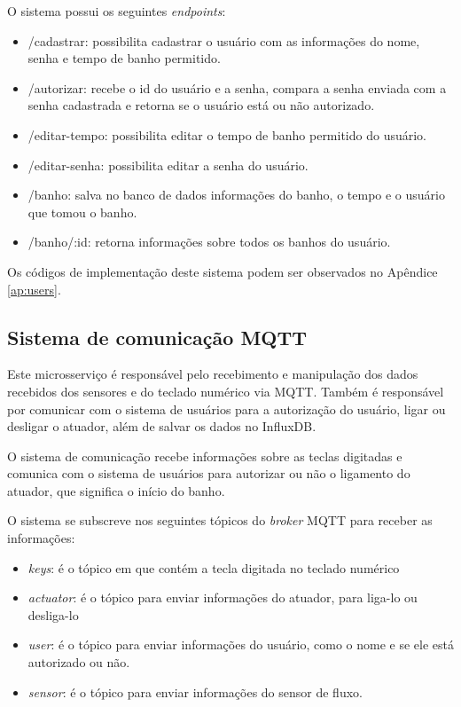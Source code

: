 O sistema possui os seguintes \textit{endpoints}:


\begin{itemize} \label{item:endpoints}
	\item /cadastrar: possibilita cadastrar o usuário com as informações do nome, senha e tempo de banho permitido.
	\item /autorizar: recebe o id do usuário e a senha, compara a senha enviada com a senha cadastrada e retorna se o usuário está ou não autorizado.
	\item /editar-tempo: possibilita editar o tempo de banho permitido do usuário.
	\item /editar-senha: possibilita editar a senha do usuário.
	\item /banho: salva no banco de dados informações do banho, o tempo e o usuário que tomou o banho.
	\item /banho/:id: retorna informações sobre todos os banhos do usuário.
\end{itemize}

Os códigos de implementação deste sistema podem ser observados no Apêndice \ref{ap:users}.

\subsection{Sistema de comunicação MQTT}

Este microsserviço é responsável pelo recebimento e manipulação dos dados recebidos dos sensores e do teclado numérico via MQTT. Também é responsável por comunicar com o sistema de usuários para a autorização do usuário, ligar ou desligar o atuador, além de salvar os dados no InfluxDB.

O sistema de comunicação recebe informações sobre as teclas digitadas e comunica com o sistema de usuários para autorizar ou não o ligamento do atuador, que significa o início do banho.

O sistema se subscreve nos seguintes tópicos do \textit{broker} MQTT para receber as informações:

\begin{itemize}
	\item \textit{keys}: é o tópico em que contém a tecla digitada no teclado numérico
	\item \textit{actuator}: é o tópico para enviar informações do atuador, para liga-lo ou desliga-lo
	\item \textit{user}: é o tópico para enviar informações do usuário, como o nome e se ele está autorizado ou não.
	\item \textit{sensor}: é o tópico para enviar informações do sensor de fluxo.
\end{itemize}

